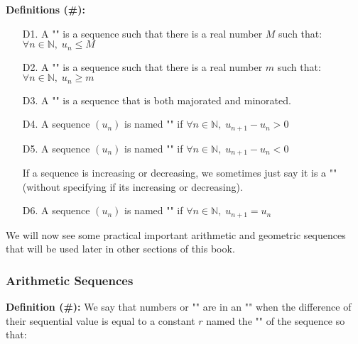 \textbf{Definitions (\#\mydef):}
	\begin{enumerate}
		\item[D1.] A "" is a sequence such that there is a real number $M$ such that:\\ $\forall n \in \mathbb{N}, \; u_n \leq M$
		
		\item[D2.] A "" is a sequence such that there is a real number $m$ such that:\\ $\forall n \in \mathbb{N}, \; u_n \geq m$
		
		\item[D3.] A "" is a sequence that is both majorated and minorated.
		
		\item[D4.] A sequence $(u_n)$ is named  "" if $\forall n \in \mathbb{N}, \; u_{n+1}-u_n > 0$
		
		\item[D5.]  A sequence $(u_n)$ is named  "" if $\forall n \in \mathbb{N}, \; u_{n+1}-u_n < 0$
		\begin{tcolorbox}[title=Remark,colframe=black,arc=10pt]
	If a sequence is increasing or decreasing, we sometimes just say it is a "" (without specifying if its increasing or decreasing).
		\end{tcolorbox}
		
		\item[D6.]  A sequence $(u_n)$ is named  "" if $\forall n \in \mathbb{N}, \; u_{n+1}=u_n$
	\end{enumerate}
	
	We will now see some practical important arithmetic and geometric sequences that will be used later in other sections of this book.
	
\subsubsection{Arithmetic Sequences}

\textbf{Definition (\#\mydef):} We say that numbers or "" are in an "" when the difference of their sequential value is equal to a constant $r$ named the "" of the sequence so that:
	
